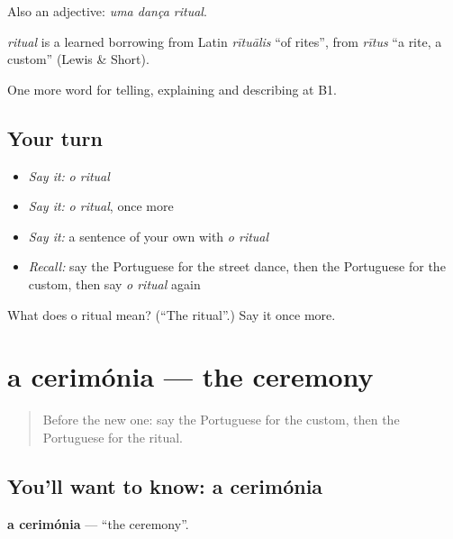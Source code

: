 Also an adjective: \emph{uma dança ritual}.

\begin{cousinweb}
\emph{ritual} is a learned borrowing from Latin \emph{rītuālis} \textquotedblleft{}of rites\textquotedblright{}, from \emph{rītus} \textquotedblleft{}a rite, a custom\textquotedblright{} (Lewis \& Short).
\end{cousinweb}

\begin{grammarlens}[title={What you've built}]
One more word for telling, explaining and describing at B1.
\end{grammarlens}

\subsection*{Your turn}
\begin{itemize}
\raggedright
  \item \emph{Say it:} \emph{o ritual}
  \item \emph{Say it:} \emph{o ritual}, once more
  \item \emph{Say it:} a sentence of your own with \emph{o ritual}
  \item \emph{Recall:} say the Portuguese for the street dance, then the Portuguese for the custom, then say \emph{o ritual} again
\end{itemize}

\begin{tcolorbox}[breakable,colback=teal!4,colframe=teal!35!black,title={Before you move on}]
What does o ritual mean? (\textquotedblleft{}The ritual\textquotedblright{}.) Say it once more.
\end{tcolorbox}
\section[a cerimónia]{a cerimónia — the ceremony}

\label{lesson:PT-C320-cerimonia}



\begin{quote}
Before the new one: say the Portuguese for the custom, then the Portuguese for the ritual.
\end{quote}

\subsection*{You'll want to know: a cerimónia}
\textbf{a cerimónia} — \textquotedblleft{}the ceremony\textquotedblright{}.

